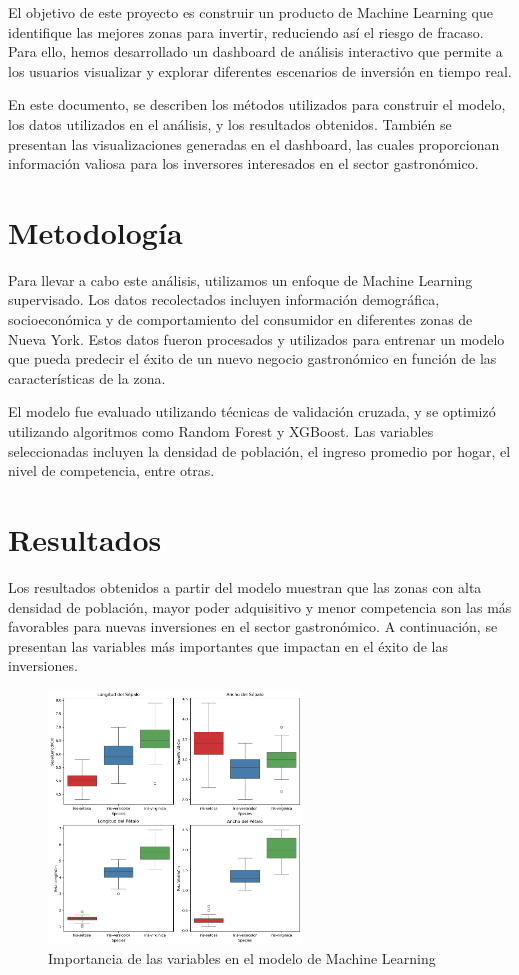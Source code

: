 \documentclass[twoside,11pt]{article}
\begin{document}
El objetivo de este proyecto es construir un producto de Machine Learning que identifique las mejores zonas para invertir, reduciendo así el riesgo de fracaso. Para ello, hemos desarrollado un dashboard de análisis interactivo que permite a los usuarios visualizar y explorar diferentes escenarios de inversión en tiempo real.

En este documento, se describen los métodos utilizados para construir el modelo, los datos utilizados en el análisis, y los resultados obtenidos. También se presentan las visualizaciones generadas en el dashboard, las cuales proporcionan información valiosa para los inversores interesados en el sector gastronómico.

\section{Metodología}

Para llevar a cabo este análisis, utilizamos un enfoque de Machine Learning supervisado. Los datos recolectados incluyen información demográfica, socioeconómica y de comportamiento del consumidor en diferentes zonas de Nueva York. Estos datos fueron procesados y utilizados para entrenar un modelo que pueda predecir el éxito de un nuevo negocio gastronómico en función de las características de la zona.

El modelo fue evaluado utilizando técnicas de validación cruzada, y se optimizó utilizando algoritmos como Random Forest y XGBoost. Las variables seleccionadas incluyen la densidad de población, el ingreso promedio por hogar, el nivel de competencia, entre otras.

\section{Resultados}

Los resultados obtenidos a partir del modelo muestran que las zonas con alta densidad de población, mayor poder adquisitivo y menor competencia son las más favorables para nuevas inversiones en el sector gastronómico. A continuación, se presentan las variables más importantes que impactan en el éxito de las inversiones.

\begin{figure}[h] 
    \centering
    \includegraphics[width=0.6\textwidth]{importancia_variables.png} 
    \caption{Importancia de las variables en el modelo de Machine Learning}
    \label{fig:importancia_variables} 
\end{figure}
\end{document}
